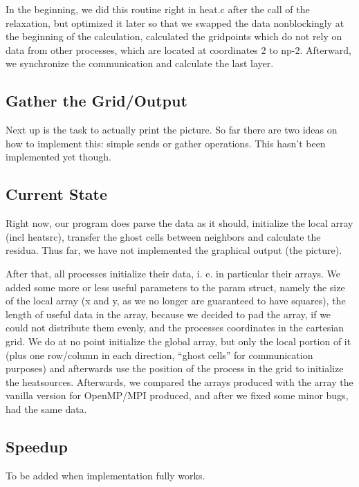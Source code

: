 In the beginning, we did this routine right in heat.c after the call of the relaxation, but optimized it later so that we swapped the data nonblockingly at the beginning of the calculation, calculated the gridpoints which do not rely on data from other processes, which are located at coordinates 2 to np-2. Afterward, we synchronize the communication and calculate the last layer.

\subsection*{Gather the Grid/Output}

Next up is the task to actually print the picture. So far there are two ideas on how to implement this: simple sends or gather operations. This hasn't been implemented yet though.  %

\subsection*{Current State}
Right now, our program does parse the data as it should, initialize the local array (incl heatsrc), transfer the ghost cells between neighbors and calculate the residua. Thus far, we have not implemented the graphical output (the picture).

After that, all processes initialize their data, i. e. in particular their arrays. We added some more or less useful parameters to the param struct, namely the size of the local array (x and y, as we no longer are guaranteed to have squares), the length of useful data in the array, because we decided to pad the array, if we could not distribute them evenly, and the processes coordinates in the cartesian grid. We do at no point initialize the global array, but only the local portion of it (plus one row/column in each direction, ``ghost cells'' for communication purposes) and afterwards use the position of the process in the grid to initialize the heatsources. Afterwards, we compared the arrays produced with the array the vanilla version for OpenMP/MPI produced, and after we fixed some minor bugs, had the same data.





\subsection*{Speedup}

To be added when implementation fully works.
